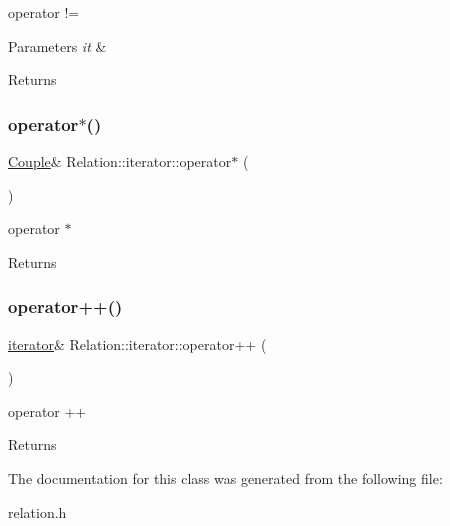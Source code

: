 operator != 


\begin{DoxyParams}{Parameters}
{\em it} & \\
\hline
\end{DoxyParams}
\begin{DoxyReturn}{Returns}

\end{DoxyReturn}
\mbox{\label{class_relation_1_1iterator_a5aab57bf0e13b345aa8a2999342bf6a6}} 
\subsubsection{\texorpdfstring{operator$\ast$()}{operator*()}}
{\footnotesize\ttfamily \hyperlink{class_couple}{Couple}\& Relation\+::iterator\+::operator$\ast$ (\begin{DoxyParamCaption}{ }\end{DoxyParamCaption})\hspace{0.3cm}{\ttfamily [inline]}}



operator $\ast$ 

\begin{DoxyReturn}{Returns}

\end{DoxyReturn}
\mbox{\label{class_relation_1_1iterator_a52415588f41fd4b55d6bf97e2f86207d}} 
\subsubsection{\texorpdfstring{operator++()}{operator++()}}
{\footnotesize\ttfamily \hyperlink{class_relation_1_1iterator}{iterator}\& Relation\+::iterator\+::operator++ (\begin{DoxyParamCaption}{ }\end{DoxyParamCaption})\hspace{0.3cm}{\ttfamily [inline]}}



operator ++ 

\begin{DoxyReturn}{Returns}

\end{DoxyReturn}


The documentation for this class was generated from the following file\+:\begin{DoxyCompactItemize}
\item 
relation.\+h\end{DoxyCompactItemize}
